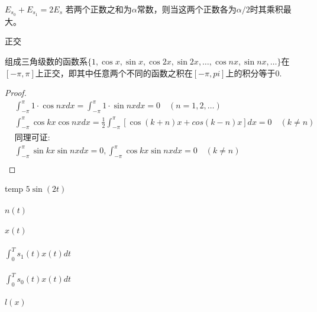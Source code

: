 \begin{frame}{$E_{s_0}+E_{s_1}=2E_s$}
若两个正数之和为$\alpha$常数，则当这两个正数各为$\alpha/2$时其乘积最大。
\end{frame}

\begin{frame}{正交}
\begin{theorem}
	组成三角级数的函数系$\{1,\cos x,\sin x,\cos 2x,\sin 2x,\dots,\cos nx,\sin nx,\dots \}$在$[-\pi,\pi]$上正交，即其中任意两个不同的函数之积在$[-\pi,pi]$上的积分等于0.
\end{theorem}
\begin{proof}
	\begin{align*}
	&\int_{-\pi}^{\pi}1\cdot\cos nxdx=\int_{-\pi}^{\pi}1\cdot\sin nxdx=0\quad (n=1,2,\dots)\\
	&\int_{-\pi}^{\pi}\cos kx\cos nxdx=\frac{1}{2}\int_{-\pi}^{\pi}[\cos(k+n)x+cos(k-n)x]dx=0\quad (k\ne n)\\
	&\text{同理可证:}\\
	&\int_{-\pi}^{\pi}\sin kx\sin nxdx=0, \int_{-\pi}^{\pi}\cos kx\sin nxdx=0\quad (k\ne n)\\
	\end{align*}
\end{proof}
\end{frame}

\begin{frame}{temp}
$5\sin(2t)$\\
~\\
$n(t)$\\
~\\
$x(t)$\\
~\\
$\int_{0}^{T}s_{1}(t)x(t)dt$\\
~\\
$\int_{0}^{T}s_{0}(t)x(t)dt$\\
~\\
$l(x)$
\end{frame}


